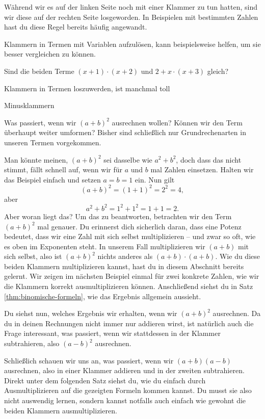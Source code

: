 \documentclass[../../main.tex]{subfiles}
\begin{document}
	Während wir es auf der linken Seite noch mit einer Klammer zu tun hatten, sind wir diese auf der rechten Seite losgeworden. In Beispielen mit bestimmten Zahlen hast du diese Regel bereits häufig angewandt.
	
	\begin{example}{}
		
	\end{example}
	
	Klammern in Termen mit Variablen aufzulösen, kann beispielsweise helfen, um sie besser vergleichen zu können.

	\begin{example}{}
		Sind die beiden Terme
			$(x+1)\cdot (x+2)$ und
			$2+x\cdot (x+3)$
		gleich?
	\end{example}

	Klammern in Termen loszuwerden, ist manchmal toll

	Minusklammern

	Was passiert, wenn wir $(a+b)^2$ ausrechnen wollen? Können wir den Term überhaupt weiter umformen? Bisher sind schließlich nur Grundrechenarten in unseren Termen vorgekommen.

	Man könnte meinen, $(a+b)^2$ sei dasselbe wie $a^2+b^2$, doch dass das nicht stimmt, fällt schnell auf, wenn wir für $a$ und $b$ mal Zahlen einsetzen. 
	Halten wir das Beispiel einfach und setzen $a=b=1$ ein. Nun gilt 
	\[(a+b)^2=(1+1)^2=2^2=4,\] aber \[a^2+b^2=1^2+1^2=1+1=2.\]
	Aber woran liegt das? Um das zu beantworten, betrachten wir den Term $(a+b)^2$ mal genauer. 
	Du erinnerst dich sicherlich daran, dass eine Potenz bedeutet, dass wir eine Zahl mit sich selbst multiplizieren -- und zwar so oft, wie es oben im Exponenten steht. 
	In unserem Fall multiplizieren wir $(a+b)$ mit sich selbst, also ist $(a+b)^2$ nichts anderes als $(a+b)\cdot (a+b)$. 
	Wie du diese beiden Klammern multiplizieren kannst, hast du in diesem Abschnitt bereits gelernt.
	Wir zeigen im nächsten Beispiel einmal für zwei konkrete Zahlen, wie wir die Klammern korrekt ausmultiplizieren können. 
	Anschließend siehst du in Satz \ref{thm:binomische-formeln}, wie das Ergebnis allgemein aussieht.

	Du siehst nun, welches Ergebnis wir erhalten, wenn wir $(a+b)^2$ ausrechnen. 
	Da du in deinen Rechnungen nicht immer nur addieren wirst, ist natürlich auch die Frage interessant, was passiert, wenn wir stattdessen in der Klammer subtrahieren, also $(a-b)^2$ ausrechnen.

	Schließlich schauen wir uns an, was passiert, wenn wir $(a+b)(a-b)$ ausrechnen, also in einer Klammer addieren und in der zweiten subtrahieren. 
	Direkt unter dem folgenden Satz siehst du, wie du einfach durch Ausmultiplizieren auf die gezeigten Formeln kommen kannst. 
	Du musst sie also nicht auswendig lernen, sondern kannst notfalls auch einfach wie gewohnt die beiden Klammern ausmultiplizieren.
\end{document}
